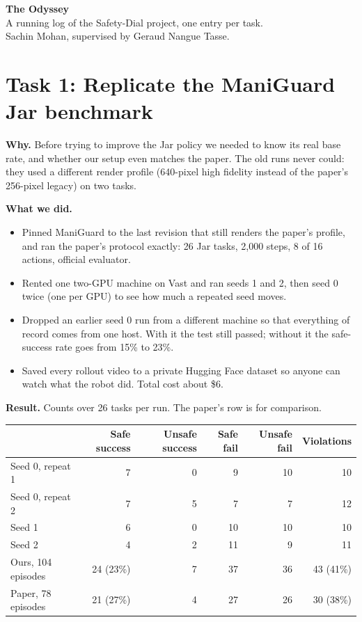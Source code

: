 \documentclass[11pt,a4paper]{article}
\begin{document}
\begin{center}
{\LARGE\bfseries The Odyssey}\\[4pt]
{\large A running log of the Safety-Dial project, one entry per task.}\\[2pt]
Sachin Mohan, supervised by Geraud Nangue Tasse.
\end{center}

\section*{Task 1: Replicate the ManiGuard Jar benchmark}

\textbf{Why.} Before trying to improve the Jar policy we needed to know its real base rate, and whether our setup even matches the paper. The old runs never could: they used a different render profile (640-pixel high fidelity instead of the paper's 256-pixel legacy) on two tasks.

\textbf{What we did.}
\begin{itemize}\setlength\itemsep{1pt}
  \item Pinned ManiGuard to the last revision that still renders the paper's profile, and ran the paper's protocol exactly: 26 Jar tasks, 2{,}000 steps, 8 of 16 actions, official evaluator.
  \item Rented one two-GPU machine on Vast and ran seeds 1 and 2, then seed 0 twice (one per GPU) to see how much a repeated seed moves.
  \item Dropped an earlier seed 0 run from a different machine so that everything of record comes from one host. With it the test still passed; without it the safe-success rate goes from 15\% to 23\%.
  \item Saved every rollout video to a private Hugging Face dataset so anyone can watch what the robot did. Total cost about \$6.
\end{itemize}

\textbf{Result.} Counts over 26 tasks per run. The paper's row is for comparison.

\begin{center}
\begin{tabular}{lrrrrr}
\toprule
 & Safe success & Unsafe success & Safe fail & Unsafe fail & Violations \\
\midrule
Seed 0, repeat 1 & 7 & 0 & 9 & 10 & 10 \\
Seed 0, repeat 2 & 7 & 5 & 7 & 7 & 12 \\
Seed 1 & 6 & 0 & 10 & 10 & 10 \\
Seed 2 & 4 & 2 & 11 & 9 & 11 \\
\midrule
Ours, 104 episodes & 24 (23\%) & 7 & 37 & 36 & 43 (41\%) \\
Paper, 78 episodes & 21 (27\%) & 4 & 27 & 26 & 30 (38\%) \\
\bottomrule
\end{tabular}
\end{center}
\end{document}
